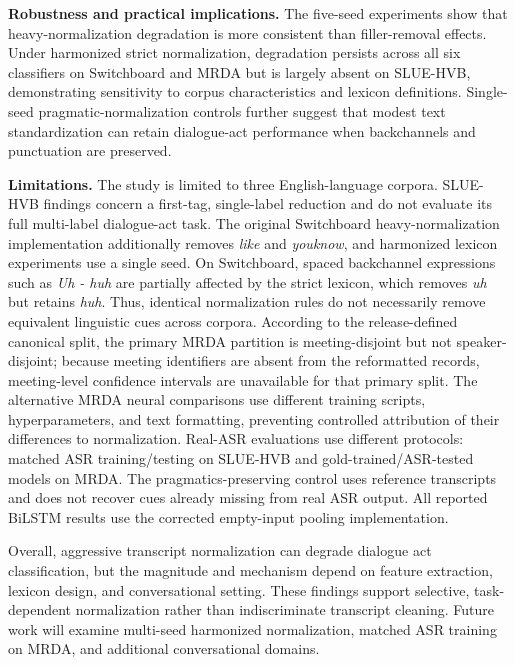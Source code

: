 \documentclass[conference]{IEEEtran}
\begin{document}
\textbf{Robustness and practical implications.}
\label{sec:swb-recovery}
The five-seed experiments show that heavy-normalization
degradation is more consistent than filler-removal
effects. Under harmonized strict normalization,
degradation persists across all six classifiers on
Switchboard and MRDA but is largely absent on
SLUE-HVB, demonstrating sensitivity to corpus
characteristics and lexicon definitions.
Single-seed pragmatic-normalization controls
further suggest that modest text standardization
can retain dialogue-act performance when
backchannels and punctuation are preserved.

\textbf{Limitations.}
The study is limited to three English-language
corpora. SLUE-HVB findings concern a first-tag,
single-label reduction and do not evaluate its full
multi-label dialogue-act task. The original Switchboard heavy-normalization
implementation additionally removes \textit{like} and \textit{youknow},
and harmonized lexicon experiments use a single seed.
On Switchboard, spaced backchannel expressions such
as \textit{Uh - huh} are partially affected by the
strict lexicon, which removes \textit{uh} but retains
\textit{huh}. Thus, identical normalization rules
do not necessarily remove equivalent linguistic cues
across corpora. According to the release-defined
canonical split, the primary MRDA partition is
meeting-disjoint but not speaker-disjoint; because
meeting identifiers are absent from the reformatted records,
meeting-level confidence intervals are unavailable
for that primary split. The alternative MRDA
neural comparisons use different training scripts,
hyperparameters, and text formatting, preventing
controlled attribution of their differences to
normalization. Real-ASR evaluations use different
protocols: matched ASR training/testing on SLUE-HVB
and gold-trained/ASR-tested models on MRDA.
The pragmatics-preserving control uses reference
transcripts and does not recover cues already
missing from real ASR output. All reported BiLSTM
results use the corrected empty-input pooling
implementation.

Overall, aggressive transcript normalization can
degrade dialogue act classification, but the
magnitude and mechanism depend on feature extraction,
lexicon design, and conversational setting.
These findings support selective, task-dependent
normalization rather than indiscriminate transcript
cleaning. Future work will examine multi-seed harmonized
normalization, matched ASR training on MRDA, and
additional conversational domains.



\end{document}
